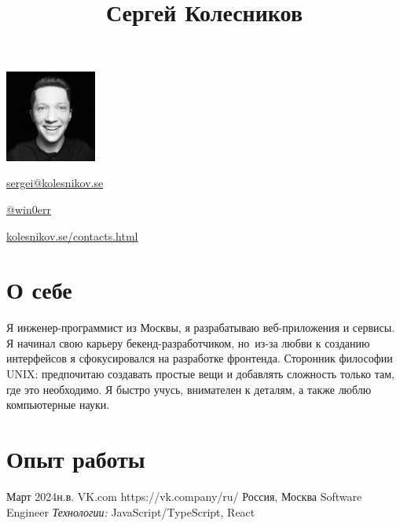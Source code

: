 \documentclass[10pt]{article}
\begin{document}
\begin{floatingfigure}[r]{3cm}
	\vspace{-.5\baselineskip}
	\includegraphics[width=3cm]{userpic}
\end{floatingfigure}

\title{Сергей Колесников}
\vspace{-.5\baselineskip}

\begin{horizontalitemize}
	\item \href{mailto:sergei@kolesnikov.se}{sergei@kolesnikov.se}
	\item \href{https://t.me/win0err}{@win0err}
	\item \href{https://kolesnikov.se/contacts.html}{kolesnikov.se/contacts.html}
\end{horizontalitemize}

\begin{summary}
\end{summary}


\vspace{-2\baselineskip}
\section{О себе}

Я инженер-программист из Москвы, я разрабатываю веб-приложения и сервисы.
Я начинал свою карьеру бекенд-разработчиком, но~из-за любви к созданию интерфейсов я сфокусировался на разработке фронтенда.
Сторонник философии UNIX: предпочитаю создавать простые вещи и добавлять сложность только там, где это необходимо.
Я быстро учусь, внимателен к деталям, а также люблю компьютерные науки.


\section{Опыт работы}

\job
	{Март 2024}{н.в.}
	{VK.com}
	{https://vk.company/ru/}  %
	{Россия, Москва}
	{Software Engineer}
	{
	  \textit{Технологии:} JavaScript/TypeScript, React
	}
\end{document}
